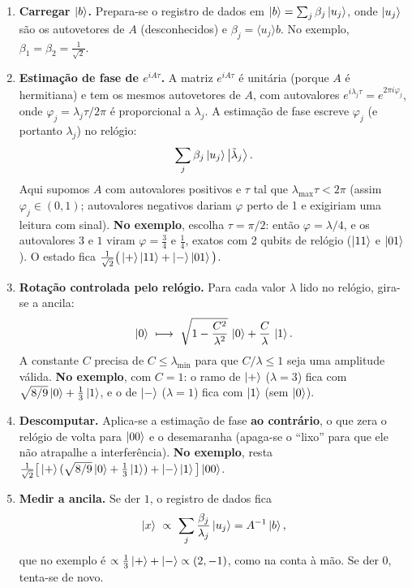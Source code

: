 \begin{enumerate}
\def\labelenumi{\arabic{enumi}.}
\tightlist
\item
  \textbf{Carregar \(\left|{b}\right>\).} Prepara-se o registro de dados em \(\left|{b}\right>=\sum_j\beta_j\left|{u_j}\right>\), onde \(\left|{u_j}\right>\) são os autovetores de \(A\) (desconhecidos) e \(\beta_j=\langle u_j\rangle{b}\). No exemplo, \(\beta_1=\beta_2=\tfrac1{\sqrt2}\).
\item
  \textbf{Estimação de fase de \(e^{iA\tau}\).} A matriz \(e^{iA\tau}\) é unitária (porque \(A\) é hermitiana) e tem os mesmos autovetores de \(A\), com autovalores \(e^{i\lambda_j\tau}=e^{2\pi i\varphi_j}\), onde \(\varphi_j=\lambda_j\tau/2\pi\) é proporcional a \(\lambda_j\). A estimação de fase escreve \(\varphi_j\) (e portanto \(\lambda_j\)) no relógio:
  \[
  \sum_j\beta_j\left|{u_j}\right>\left|{\tilde\lambda_j}\right>.
  \]
  Aqui supomos \(A\) com autovalores positivos e \(\tau\) tal que \(\lambda_{\max}\tau<2\pi\) (assim \(\varphi_j\in(0,1)\); autovalores negativos dariam \(\varphi\) perto de 1 e exigiriam uma leitura com sinal). \textbf{No exemplo}, escolha \(\tau=\pi/2\): então \(\varphi=\lambda/4\), e os autovalores \(3\) e \(1\) viram \(\varphi=\tfrac34\) e \(\tfrac14\), exatos com 2 qubits de relógio (\(\left|{11}\right>\) e \(\left|{01}\right>\)). O estado fica \(\tfrac1{\sqrt2}\big(\left|{+}\right>\left|{11}\right>+\left|{-}\right>\left|{01}\right>\big)\).
\item
  \textbf{Rotação controlada pelo relógio.} Para cada valor \(\lambda\) lido no relógio, gira-se a ancila:
  \[
  \ket0\ \longmapsto\ \sqrt{1-\frac{C^2}{\lambda^2}}\,\ket0+\frac{C}{\lambda}\,\ket1 .
  \]
  A constante \(C\) precisa de \(C\le\lambda_{\min}\) para que \(C/\lambda\le1\) seja uma amplitude válida. \textbf{No exemplo}, com \(C=1\): o ramo de \(\left|{+}\right>\) (\(\lambda=3\)) fica com \(\sqrt{8/9}\left|{0}\right>+\tfrac13\left|{1}\right>\), e o de \(\left|{-}\right>\) (\(\lambda=1\)) fica com \(\left|{1}\right>\) (sem \(\left|{0}\right>\)).
\item
  \textbf{Descomputar.} Aplica-se a estimação de fase \textbf{ao contrário}, o que zera o relógio de volta para \(\left|{00}\right>\) e o desemaranha (apaga-se o ``lixo'' para que ele não atrapalhe a interferência). \textbf{No exemplo}, resta \(\tfrac1{\sqrt2}\big[\left|{+}\right>(\sqrt{8/9}\left|{0}\right>+\tfrac13\left|{1}\right>)+\left|{-}\right>\left|{1}\right>\big]\left|{00}\right>\).
\item
  \textbf{Medir a ancila.} Se der \(1\), o registro de dados fica
  \[
  \ket{x}\ \propto\ \sum_j \frac{\beta_j}{\lambda_j}\ket{u_j}=A^{-1}\ket b ,
  \]
  que no exemplo é \(\propto\tfrac13\left|{+}\right>+\left|{-}\right>\propto(2,-1)\), como na conta à mão. Se der \(0\), tenta-se de novo.
\end{enumerate}

